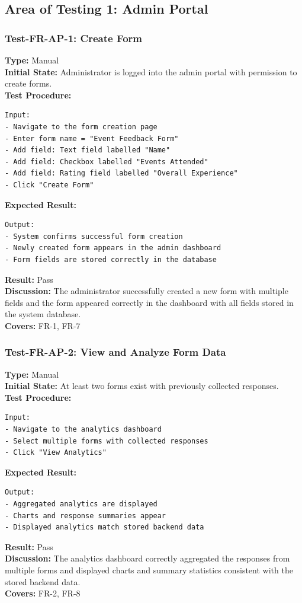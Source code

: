 \documentclass[12pt, titlepage]{article}
\begin{document}
\subsection{Area of Testing 1: Admin Portal}
\subsubsection{Test-FR-AP-1: Create Form}
\textbf{Type:} Manual \\ \textbf{Initial State:} Administrator is logged into the admin portal with permission to create forms. \\ \textbf{Test Procedure:}
\begin{verbatim}
Input:
- Navigate to the form creation page
- Enter form name = "Event Feedback Form"
- Add field: Text field labelled "Name"
- Add field: Checkbox labelled "Events Attended"
- Add field: Rating field labelled "Overall Experience"
- Click "Create Form"
\end{verbatim}
\textbf{Expected Result:}
\begin{verbatim}
Output:
- System confirms successful form creation
- Newly created form appears in the admin dashboard
- Form fields are stored correctly in the database
\end{verbatim}
\textbf{Result:} Pass \\
\textbf{Discussion:} The administrator successfully created a new form with multiple fields and the form appeared correctly in the dashboard with all fields stored in the system database. \\
\textbf{Covers:} FR-1, FR-7 \\

\subsubsection{Test-FR-AP-2: View and Analyze Form Data}
\textbf{Type:} Manual \\ \textbf{Initial State:} At least two forms exist with previously collected responses. \\ \textbf{Test Procedure:}
\begin{verbatim}
Input:
- Navigate to the analytics dashboard
- Select multiple forms with collected responses
- Click "View Analytics"
\end{verbatim}
\textbf{Expected Result:}
\begin{verbatim}
Output:
- Aggregated analytics are displayed
- Charts and response summaries appear
- Displayed analytics match stored backend data
\end{verbatim}
\textbf{Result:} Pass \\ \textbf{Discussion:} The analytics dashboard correctly aggregated the responses from multiple forms and displayed charts and summary statistics consistent with the stored backend data. \\
\textbf{Covers:} FR-2, FR-8 \\
\end{document}
